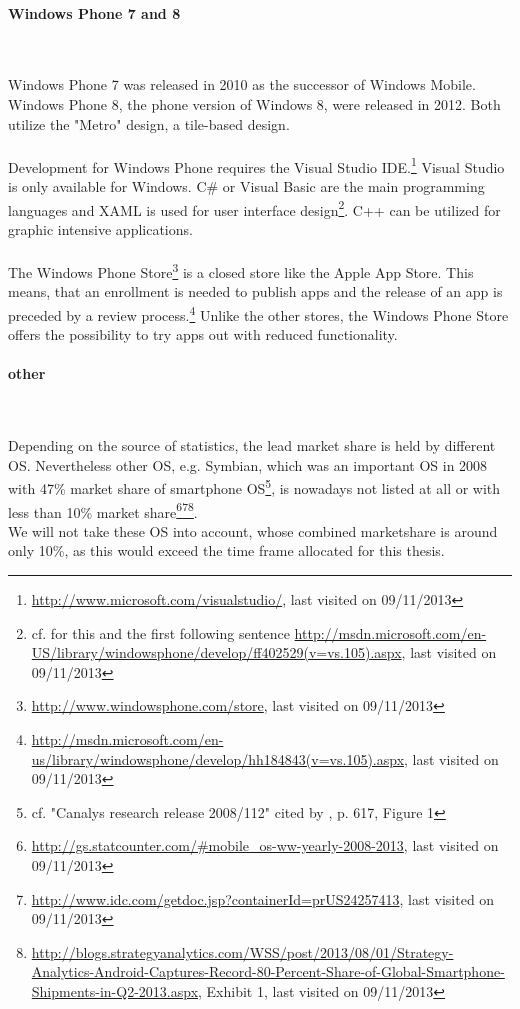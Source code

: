 \paragraph{Windows Phone 7 and 8}$\;$

\vspace{0.75em}
Windows Phone 7 was released in 2010 as the successor of Windows Mobile. Windows Phone 8, the phone version of Windows 8, were released in 2012. Both utilize the "Metro" design, a tile-based design.
\\
\\
Development for Windows Phone requires the Visual Studio IDE.\footnote{\url{http://www.microsoft.com/visualstudio/}, last visited on 09/11/2013} Visual Studio is only available for Windows. C\# or Visual Basic are the main programming languages and XAML is used for user interface design\footnote{cf. for this and the first following sentence \url{http://msdn.microsoft.com/en-US/library/windowsphone/develop/ff402529(v=vs.105).aspx}, last visited on 09/11/2013}. C++ can be utilized for graphic intensive applications.
\\
\\
The Windows Phone Store\footnote{\url{http://www.windowsphone.com/store}, last visited on 09/11/2013} is a closed store like the Apple App Store. This means, that an enrollment is needed to publish apps and the release of an app is preceded by a review process.\footnote{\url{http://msdn.microsoft.com/en-us/library/windowsphone/develop/hh184843(v=vs.105).aspx}, last visited on 09/11/2013} Unlike the other stores, the Windows Phone Store offers the possibility to try apps out with reduced functionality.

\paragraph{other}$\;$

\vspace{0.75em}
Depending on the source of statistics, the lead market share is held by different OS. Nevertheless other OS, e.g. Symbian, which was an important OS in 2008 with 47\% market share of smartphone OS\footnote{cf. "Canalys research release 2008/112" cited by \cite{Lin.2009}, p. 617, Figure 1}, is nowadays not listed at all or with less than 10\% market share\footnote{\url{http://gs.statcounter.com/\#mobile_os-ww-yearly-2008-2013}, last visited on 09/11/2013}\footnote{\url{http://www.idc.com/getdoc.jsp?containerId=prUS24257413}, last visited on 09/11/2013}\footnote{\url{http://blogs.strategyanalytics.com/WSS/post/2013/08/01/Strategy-Analytics-Android-Captures-Record-80-Percent-Share-of-Global-Smartphone-Shipments-in-Q2-2013.aspx}, Exhibit 1, last visited on 09/11/2013}.
\\
We will not take these OS into account, whose combined marketshare is around only 10\%, as this would exceed the time frame allocated for this thesis.

